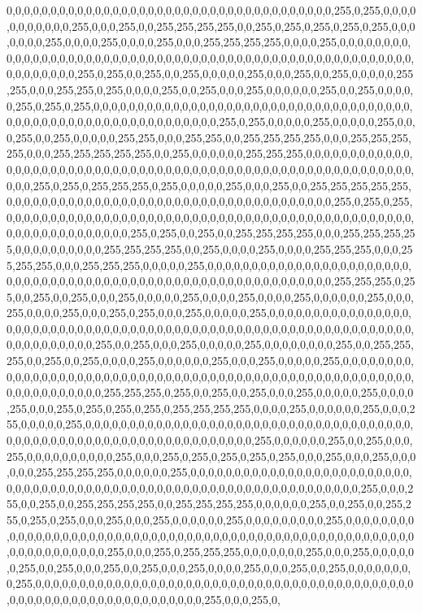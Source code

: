 0,0,0,0,0,0,0,0,0,0,0,0,0,0,0,0,0,0,0,0,0,0,0,0,0,0,0,0,0,0,0,0,0,0,0,0,0,255,0,255,0,0,0,0,0,0,0,0,0,0,0,255,0,0,0,255,0,0,255,255,255,255,0,0,255,0,255,0,255,0,255,0,255,0,0,0,0,0,0,0,255,0,0,0,0,255,0,0,0,0,255,0,0,0,255,255,255,255,0,0,0,0,255,0,0,0,0,0,0,0,0,0,0,0,0,0,0,0,0,0,0,0,0,0,0,0,0,0,0,0,0,0,0,0,0,0,0,0,0,0,0,0,0,0,0,0,0,0,0,0,0,0,0,0,0,0,0,0,0,0,0,0,0,0,0,255,0,255,0,0,255,0,0,255,0,0,0,0,0,255,0,0,0,255,0,0,255,0,0,0,0,0,255,255,0,0,0,255,255,0,255,0,0,0,0,255,0,0,255,0,0,0,255,0,0,0,0,0,0,255,0,0,255,0,0,0,0,0,255,0,255,0,255,0,0,0,0,0,0,0,0,0,0,0,0,0,0,0,0,0,0,0,0,0,0,0,0,0,0,0,0,0,0,0,0,0,0,0,0,0,0,0,0,0,0,0,0,0,0,0,0,0,0,0,0,0,0,0,0,0,0,0,0,255,0,255,0,0,0,0,0,255,0,0,0,0,0,255,0,0,0,255,0,0,255,0,0,0,0,0,255,255,0,0,0,255,255,0,0,255,255,255,255,0,0,0,255,255,255,255,0,0,0,255,255,255,255,255,0,0,255,0,0,0,0,0,0,255,255,255,0,0,0,0,0,0,0,0,0,0,0,0,0,0,0,0,0,0,0,0,0,0,0,0,0,0,0,0,0,0,0,0,0,0,0,0,0,0,0,0,0,0,0,0,0,0,0,0,0,0,0,0,0,0,0,0,0,0,0,0,0,255,0,255,0,255,255,255,0,255,0,0,0,0,0,255,0,0,0,255,0,0,255,255,255,255,255,0,0,0,0,0,0,0,0,0,0,0,0,0,0,0,0,0,0,0,0,0,0,0,0,0,0,0,0,0,0,0,0,0,0,0,0,0,255,0,255,0,255,0,0,0,0,0,0,0,0,0,0,0,0,0,0,0,0,0,0,0,0,0,0,0,0,0,0,0,0,0,0,0,0,0,0,0,0,0,0,0,0,0,0,0,0,0,0,0,0,0,0,0,0,0,0,0,0,0,0,0,0,255,0,255,0,0,255,0,0,255,255,255,255,0,0,0,255,255,255,255,0,0,0,0,0,0,0,0,0,0,255,255,255,255,0,0,255,0,0,0,0,255,0,0,0,0,255,255,255,0,0,0,255,255,255,0,0,0,255,255,255,0,0,0,0,0,255,0,0,0,0,0,0,0,0,0,0,0,0,0,0,0,0,0,0,0,0,0,0,0,0,0,0,0,0,0,0,0,0,0,0,0,0,0,0,0,0,0,0,0,0,0,0,0,0,0,0,0,0,0,0,0,0,0,0,0,0,255,255,255,0,255,0,0,255,0,0,255,0,0,0,255,0,0,0,0,0,255,0,0,0,0,255,0,0,0,0,255,0,0,0,0,0,0,255,0,0,0,255,0,0,0,0,255,0,0,0,255,0,255,0,0,0,255,0,0,0,0,0,255,0,0,0,0,0,0,0,0,0,0,0,0,0,0,0,0,0,0,0,0,0,0,0,0,0,0,0,0,0,0,0,0,0,0,0,0,0,0,0,0,0,0,0,0,0,0,0,0,0,0,0,0,0,0,0,0,0,0,0,0,0,0,0,0,0,0,0,0,0,0,0,0,255,0,0,255,0,0,0,255,0,0,0,0,0,255,0,0,0,0,0,0,0,0,255,0,0,255,255,255,0,0,255,0,0,255,0,0,0,0,255,0,0,0,0,0,0,255,0,0,0,255,0,0,0,0,0,255,0,0,0,0,0,0,0,0,0,0,0,0,0,0,0,0,0,0,0,0,0,0,0,0,0,0,0,0,0,0,0,0,0,0,0,0,0,0,0,0,0,0,0,0,0,0,0,0,0,0,0,0,0,0,0,0,0,0,0,0,0,0,0,0,0,255,255,255,0,255,0,0,255,0,0,255,0,0,0,255,0,0,0,0,0,255,0,0,0,0,255,0,0,0,255,0,255,0,255,0,255,0,255,255,255,255,0,0,0,0,255,0,0,0,0,0,0,255,0,0,0,255,0,0,0,0,0,255,0,0,0,0,0,0,0,0,0,0,0,0,0,0,0,0,0,0,0,0,0,0,0,0,0,0,0,0,0,0,0,0,0,0,0,0,0,0,0,0,0,0,0,0,0,0,0,0,0,0,0,0,0,0,0,0,0,0,0,0,0,0,0,0,0,255,0,0,0,0,0,0,255,0,0,255,0,0,0,255,0,0,0,0,0,0,0,0,0,0,255,0,0,0,255,0,255,0,255,0,255,0,255,0,0,0,255,0,0,0,255,0,0,0,0,0,0,255,255,255,255,0,0,0,0,0,0,255,0,0,0,0,0,0,0,0,0,0,0,0,0,0,0,0,0,0,0,0,0,0,0,0,0,0,0,0,0,0,0,0,0,0,0,0,0,0,0,0,0,0,0,0,0,0,0,0,0,0,0,0,0,0,0,0,0,0,0,0,0,0,0,0,0,255,0,0,0,255,0,0,255,0,0,255,255,255,255,0,0,255,255,255,255,0,0,0,0,0,0,255,0,0,255,0,0,255,255,0,255,0,255,0,0,0,255,0,0,0,255,0,0,0,0,0,0,255,0,0,0,0,0,0,0,0,0,255,0,0,0,0,0,0,0,0,0,0,0,0,0,0,0,0,0,0,0,0,0,0,0,0,0,0,0,0,0,0,0,0,0,0,0,0,0,0,0,0,0,0,0,0,0,0,0,0,0,0,0,0,0,0,0,0,0,0,0,0,0,0,0,0,0,255,0,0,0,255,0,255,255,255,0,0,0,0,0,0,0,255,0,0,0,255,0,0,0,0,0,0,255,0,0,255,0,0,0,255,0,0,255,0,0,0,255,0,0,0,0,255,0,0,0,255,0,0,255,0,0,0,0,0,0,0,0,255,0,0,0,0,0,0,0,0,0,0,0,0,0,0,0,0,0,0,0,0,0,0,0,0,0,0,0,0,0,0,0,0,0,0,0,0,0,0,0,0,0,0,0,0,0,0,0,0,0,0,0,0,0,0,0,0,0,0,0,0,0,0,0,0,0,255,0,0,0,255,0,